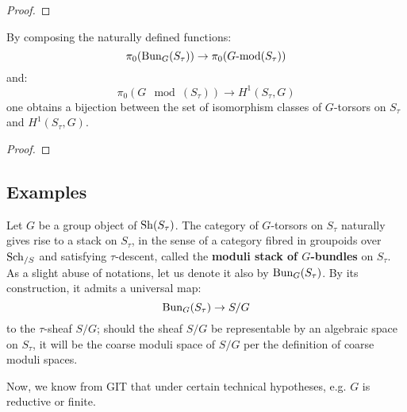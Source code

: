                 \begin{proof}
                    
                \end{proof}
            \begin{theorem}
                By composing the naturally defined functions:
                    $$\pi_0( \mathrm{Bun}_G(S_{\tau}) ) \to \pi_0(G\text{-}\mathrm{mod}(S_{\tau}))$$
                and:
                    $$\pi_0( G\mod(S_{\tau}) ) \to H^1(S_{\tau}, G)$$
                one obtains a bijection between the set of isomorphism classes of $G$-torsors on $S_{\tau}$ and $H^1(S_{\tau}, G)$.
            \end{theorem}
                \begin{proof}
                    
                \end{proof}

        \subsection{Examples}
            \begin{example}
                Let $G$ be a group object of $\mathrm{Sh}(S_{\tau})$. The category of $G$-torsors on $S_{\tau}$ naturally gives rise to a stack on $S_{\tau}$, in the sense of a category fibred in groupoids over $\mathrm{Sch}_{/S}$ and satisfying $\tau$-descent, called the \textbf{moduli stack of $G$-bundles} on $S_{\tau}$. As a slight abuse of notations, let us denote it also by $\mathrm{Bun}_G(S_{\tau})$. By its construction, it admits a universal map:
                    $$\mathrm{Bun}_G(S_{\tau}) \to S/G$$
                to the $\tau$-sheaf $S/G$; should the sheaf $S/G$ be representable by an algebraic space on $S_{\tau}$, it will be the coarse moduli space of $S/G$ per the definition of coarse moduli spaces.

                Now, we know from GIT that under certain technical hypotheses, e.g. $G$ is reductive or finite.
            \end{example}

            \begin{example}
                
            \end{example}

            \begin{example}[Twistings]
                
            \end{example}

